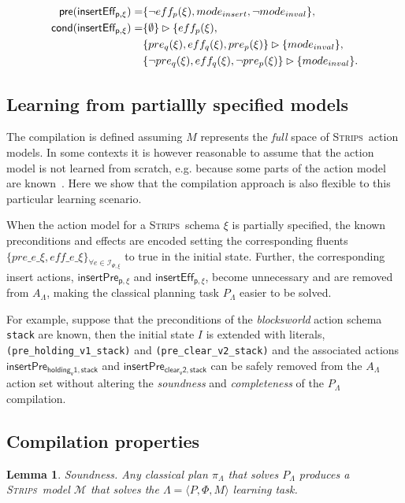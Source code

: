 \documentclass{article}
\newcommand{\tup}[1]{{\langle #1 \rangle}}
\newcommand{\pre}{\mathsf{pre}}     %
\newcommand{\cond}{\mathsf{cond}}   %
\newcommand{\strips}{\textsc{Strips}}
\newtheorem{mylemma}[mytheorem]{Lemma}
\begin{document}
\begin{small}
\begin{align*}
\hspace*{7pt}\pre(\mathsf{insertEff_{p,\xi}})=&\{\neg eff_{p}(\xi), mode_{insert},\neg mode_{inval}\},\\
\cond(\mathsf{insertEff_{p,\xi}})=&\{\emptyset\}\rhd\{eff_{p}(\xi),\\
&\{pre_{q}(\xi),eff_{q}(\xi),pre_{p}(\xi)\}\rhd\{mode_{inval}\},\\
&\{\neg pre_{q}(\xi),eff_{q}(\xi),\neg pre_{p}(\xi)\}\rhd\{mode_{inval}\}.
\end{align*}
\end{small}



\subsection{Learning from partiallly specified models}
The compilation is defined assuming $M$ represents the {\em full} space of \strips\ action models. In some contexts it is however reasonable to assume that the action model is not learned from scratch, e.g. because some parts of the action model are known~\cite{ZhuoNK13,sreedharan2018handling}. Here we show that the compilation approach is also flexible to this particular learning scenario.

When the action model for a \strips\ schema $\xi$ is partially specified, the known preconditions and effects are encoded setting the corresponding fluents $\{pre\_e\_\xi, eff\_e\_\xi\}_{\forall e\in{\mathcal I}_{\Psi,\xi}}$ to true in the initial state. Further, the corresponding insert actions, $\mathsf{insertPre_{p,\xi}}$ and $\mathsf{insertEff_{p,\xi}}$, become unnecessary and are removed from $A_{\Lambda}$, making the classical planning task $P_{\Lambda}$ easier to be solved.

For example, suppose that the preconditions of the {\em blocksworld} action schema {\tt stack} are known, then the initial state $I$ is extended with literals, {\small\tt(pre\_holding\_v1\_stack)} and {\small\tt(pre\_clear\_v2\_stack)} and the associated actions $\mathsf{insertPre_{holding_v1,stack}}$ and $\mathsf{insertPre_{clear_v2,stack}}$ can be safely removed from the $A_{\Lambda}$ action set without altering the {\em soundness} and {\em completeness} of the $P_{\Lambda}$ compilation.

\subsection{Compilation properties}
\begin{mylemma}
Soundness. Any classical plan $\pi_{\Lambda}$ that solves $P_{\Lambda}$ produces a \strips\ model $\mathcal{M}$ that solves the $\Lambda=\tup{P,\Phi,M}$ learning task.
\end{mylemma}
\end{document}
